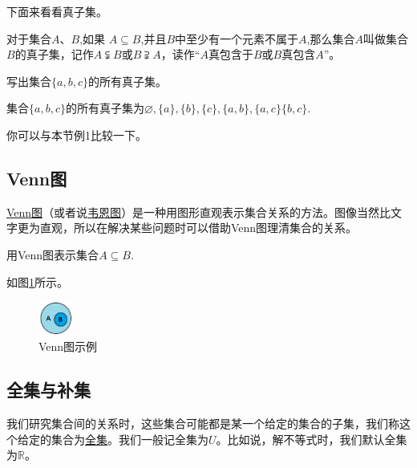 \documentclass[lang=cn,math=cm,chinesefont=nofont,11pt,scheme=chinese,onecol]{elegantbook}
\begin{document}
下面来看看真子集。
\begin{definition}[真子集]
  对于集合$A$、$B$,如果 $A\subseteq B$,并且$B$中至少有一个元素不属于$A$,那么集合$A$叫做集合$B$的真子集，记作$A\subsetneqq B$或$B\supsetneqq A$，读作“$A$真包含于$B$或$B$真包含$A$”。
\end{definition}

\begin{example}
  写出集合$\{a,b,c\}$的所有真子集。
\end{example}
\begin{solution}集合$\{a,b,c\}$的所有真子集为$\varnothing ,\{a\},\{b\},\{c\},\{a,b\},\{a,c\}\{b,c\}$.
\end{solution}

\begin{remark}
  你可以与本节例1比较一下。
\end{remark}

\subsection{Venn图}
  \underline{Venn图}（或者说\underline{韦恩图}）是一种用图形直观表示集合关系的方法。图像当然比文字更为直观，所以在解决某些问题时可以借助Venn图理清集合的关系。

\begin{example}
  用Venn图表示集合$A\subseteq B$.
\end{example}
\begin{solution}
  如图\ref{img:Venn1}所示。
\end{solution}
\begin{figure}[h]
  \centering
  \includegraphics[width=0.1\textwidth]{image/Venn1.png}
  \caption{Venn图示例}
  \label{img:Venn1}
\end{figure}

\subsection{全集与补集}
  我们研究集合间的关系时，这些集合可能都是某一个给定的集合的子集，我们称这个给定的集合为\underline{全集}。我们一般记全集为$U$。比如说，解不等式时，我们默认全集为$\mathbb{R}$。
\end{document}
